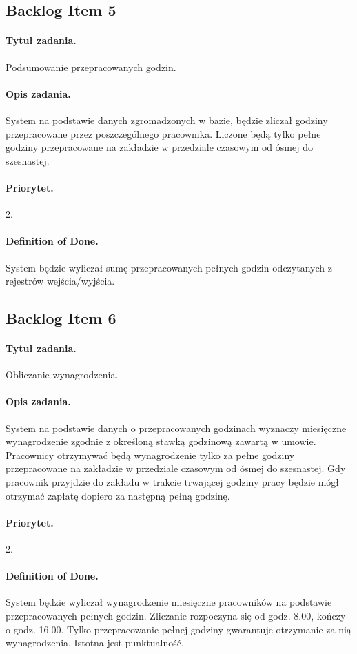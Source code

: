 \documentclass[a4paper]{article}
\begin{document}
\subsection{Backlog Item 5}
\paragraph{Tytuł zadania.} Podsumowanie przepracowanych godzin.
\paragraph{Opis zadania.} System na podstawie danych zgromadzonych w bazie, będzie zliczał godziny przepracowane przez poszczególnego pracownika. Liczone będą tylko pełne godziny przepracowane na zakładzie w przedziale czasowym od ósmej do szesnastej.
\paragraph{Priorytet.} 2.
\paragraph{Definition of Done.} System będzie wyliczał sumę przepracowanych pełnych godzin odczytanych z rejestrów wejścia/wyjścia.

\subsection{Backlog Item 6}
\paragraph{Tytuł zadania.} Obliczanie wynagrodzenia.
\paragraph{Opis zadania.} System na podstawie danych o przepracowanych godzinach wyznaczy miesięczne wynagrodzenie zgodnie z określoną stawką godzinową zawartą w umowie. Pracownicy otrzymywać będą wynagrodzenie tylko za pełne godziny przepracowane na zakładzie w przedziale czasowym od ósmej do szesnastej. Gdy pracownik przyjdzie do zakładu w trakcie trwającej godziny pracy będzie mógł otrzymać zapłatę dopiero za następną pełną godzinę.
\paragraph{Priorytet.} 2.
\paragraph{Definition of Done.} System będzie wyliczał wynagrodzenie miesięczne pracowników na podstawie przepracowanych pełnych godzin. Zliczanie rozpoczyna się od godz. 8.00, kończy o godz. 16.00. Tylko przepracowanie pełnej godziny gwarantuje otrzymanie za nią wynagrodzenia. Istotna jest punktualność.
\end{document}
